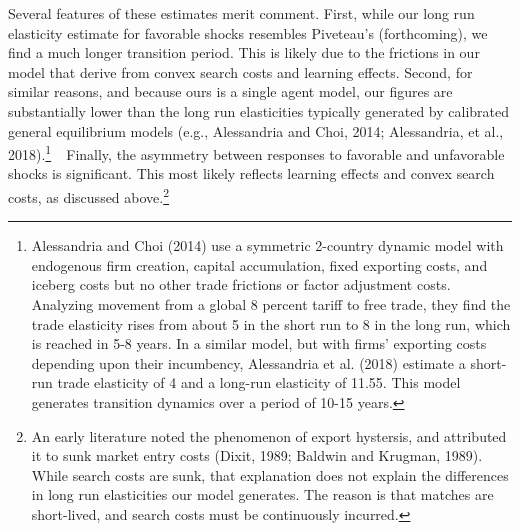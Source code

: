\documentclass[12pt]{article}
\begin{document}
Several features of these estimates merit comment. First, while our long run
elasticity estimate for favorable shocks resembles Piveteau's (forthcoming), we
find a much longer transition period. This is likely due to the frictions in
our model that derive from convex search costs and learning effects. Second,
for similar reasons, and because ours is a single agent model, our figures
are substantially lower than the long run elasticities typically generated
by calibrated general equilibrium models (e.g., Alessandria and Choi, 2014;
Alessandria, et al., 2018).\footnote{%
Alessandria and Choi (2014) use a symmetric 2-country dynamic model with
endogenous firm creation, capital accumulation, fixed exporting costs, and
iceberg costs but no other trade frictions or factor adjustment costs.
Analyzing movement from a global 8 percent tariff to free trade, they find
the trade elasticity rises from about 5 in the short run to 8 in the long
run, which is reached in 5-8 years. In a similar model, but with firms'
exporting costs depending upon their incumbency, Alessandria et al. (2018)
estimate a short-run trade elasticity of 4 and a long-run elasticity of
11.55. This model generates transition dynamics over a period of 10-15 years.%
\medskip}\textbf{\ }\ Finally, the asymmetry between responses to favorable and
unfavorable shocks is significant. This most likely reflects learning
effects and convex search costs, as discussed above.\footnote{%
An early literature noted the phenomenon of export hystersis, and attributed
it to sunk market entry costs (Dixit, 1989; Baldwin and Krugman, 1989). While
search costs are sunk, that explanation does not explain the differences in
long run elasticities our model generates. The reason is that matches are
short-lived, and search costs must be continuously incurred.\medskip}
\end{document}
